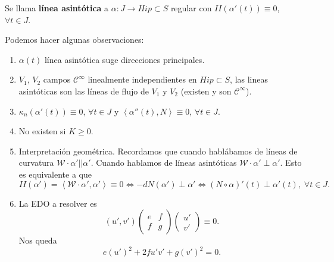\begin{definition}
Se llama \textbf{línea asintótica} a $\displaystyle \alpha : J \to Hip\subset S $ regular con $\displaystyle II\left(\alpha'\left(t\right)\right)\equiv 0 $, $\displaystyle \forall t \in J $. 
\end{definition}
\begin{observation}
Podemos hacer algunas observaciones:
\begin{enumerate}
\item $\displaystyle \alpha\left(t\right) $ línea asintótica suge direcciones principales.
\item $\displaystyle V_{1} $, $\displaystyle V_{2} $ campos $\displaystyle \mathcal{C}^{\infty } $ linealmente independientes en $\displaystyle Hip\subset S $, las lineas asintóticas son las líneas de flujo de $\displaystyle V_{1} $ y $\displaystyle V_{2} $ (existen y son $\displaystyle \mathcal{C}^{\infty } $).
\item $\displaystyle \kappa_{n}\left(\alpha'\left(t\right)\right)\equiv 0 $, $\displaystyle \forall t \in J $ y $\displaystyle \left\langle \alpha''\left(t\right), N \right\rangle \equiv 0 $, $\displaystyle \forall t \in J $.
\item No existen si $\displaystyle K \geq 0 $. 
\item Interpretación geométrica. Recordamos que cuando hablábamos de líneas de curvatura $\displaystyle \mathcal{W} \cdot \alpha' | | \alpha' $. Cuando hablamos de líneas asintóticas $\displaystyle \mathcal{W} \cdot \alpha' \perp \alpha ' $. Esto es equivalente a que 
	\[ II\left(\alpha'\right)=\left\langle \mathcal{W} \cdot \alpha', \alpha' \right\rangle \equiv 0 \iff -dN\left(\alpha'\right)\perp \alpha' \iff \left(N\circ \alpha \right)'\left(t\right)\perp \alpha'\left(t\right), \; \forall t \in J .\]
\item La EDO a resolver es 
	\[\left(u', v'\right)\begin{pmatrix} e & f \\ f & g \end{pmatrix}\begin{pmatrix} u'\\ v' \end{pmatrix}\equiv 0 .\]
	Nos queda
	\[e\left(u'\right)^{2}+2fu'v' + g\left(v'\right)^{2}=0 .\]
\end{enumerate}
\end{observation}
